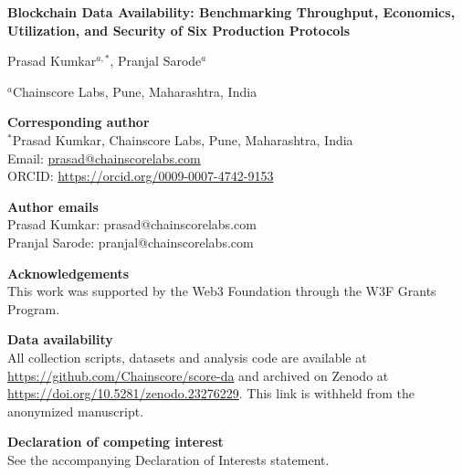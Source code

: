 \documentclass[11pt]{article}
\begin{document}
\begin{center}
{\Large\bfseries Blockchain Data Availability: Benchmarking Throughput, Economics, Utilization, and Security of Six Production Protocols\par}
\vspace{1.5em}
{\large Prasad Kumkar$^{a,*}$, Pranjal Sarode$^{a}$\par}
\vspace{0.8em}
$^{a}$Chainscore Labs, Pune, Maharashtra, India
\end{center}

\vspace{1em}
\noindent\textbf{Corresponding author}\\
$^{*}$Prasad Kumkar, Chainscore Labs, Pune, Maharashtra, India\\
Email: \href{mailto:prasad@chainscorelabs.com}{prasad@chainscorelabs.com}\\
ORCID: \url{https://orcid.org/0009-0007-4742-9153}

\vspace{1em}
\noindent\textbf{Author emails}\\
Prasad Kumkar: prasad@chainscorelabs.com\\
Pranjal Sarode: pranjal@chainscorelabs.com

\vspace{1em}
\noindent\textbf{Acknowledgements}\\
This work was supported by the Web3 Foundation through the W3F Grants Program.

\vspace{1em}
\noindent\textbf{Data availability}\\
All collection scripts, datasets and analysis code are available at \url{https://github.com/Chainscore/score-da} and archived on Zenodo at \url{https://doi.org/10.5281/zenodo.23276229}. This link is withheld from the anonymized manuscript.

\vspace{1em}
\noindent\textbf{Declaration of competing interest}\\
See the accompanying Declaration of Interests statement.
\end{document}

